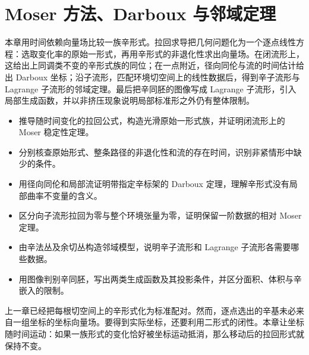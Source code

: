 
% 
% 

\chapter{Moser 方法、Darboux 与邻域定理}
\label{g4:ch:08}

\begin{chapterabstract}
本章用时间依赖向量场比较一族辛形式。拉回求导把几何问题化为一个逐点线性方程：选取变化率的原始一形式，再用辛形式的非退化性求出向量场。在闭流形上，这给出上同调类不变的辛形式族的同位；在一点附近，径向同伦与流的时间估计给出 Darboux 坐标；沿子流形，匹配环境切空间上的线性数据后，得到辛子流形与 Lagrange 子流形的邻域定理。最后把辛同胚的图像写成 Lagrange 子流形，引入局部生成函数，并以非挤压现象说明局部标准形之外仍有整体限制。
\end{chapterabstract}

\begin{learninggoals}
\begin{itemize}
	\item 推导随时间变化的拉回公式，构造光滑原始一形式族，并证明闭流形上的 Moser 稳定性定理。
	\item 分别核查原始形式、整条路径的非退化性和流的存在时间，识别非紧情形中缺少的条件。
	\item 用径向同伦和局部流证明带指定辛标架的 Darboux 定理，理解辛形式没有局部曲率不变量的含义。
	\item 区分向子流形拉回为零与整个环境张量为零，证明保留一阶数据的相对 Moser 定理。
	\item 由辛法丛及余切丛构造邻域模型，说明辛子流形和 Lagrange 子流形各需要哪些数据。
	\item 用图像判别辛同胚，写出两类生成函数及其投影条件，并区分面积、体积与辛嵌入的限制。
\end{itemize}
\end{learninggoals}

上一章已经把每根切空间上的辛形式化为标准配对。然而，逐点选出的辛基未必来自一组坐标的坐标向量场。要得到实际坐标，还要利用二形式的闭性。本章让坐标随时间运动：如果一族形式的变化恰好被坐标运动抵消，那么移动后的拉回形式就保持不变。

\ProseParagraphBreak

